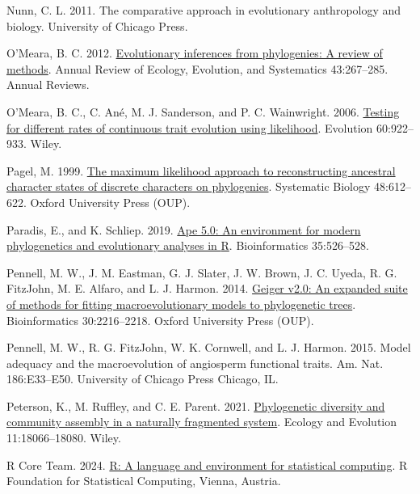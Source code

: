 \documentclass[fleqn,10pt,lineno]{wlpeerj} %
\newlength{\cslhangindent}
\newenvironment{CSLReferences}[2] %
 {\begin{list}{}{%
  \setlength{\itemindent}{0pt}
  \setlength{\leftmargin}{0pt}
  \setlength{\parsep}{0pt}
  \ifodd #1
   \setlength{\leftmargin}{\cslhangindent}
   \setlength{\itemindent}{-1\cslhangindent}
  \fi
  \setlength{\itemsep}{#2\baselineskip}}}
 {\end{list}}
\begin{document}
\begin{CSLReferences}{1}{0}
Nunn, C. L. 2011. The comparative approach in evolutionary anthropology and biology. University of Chicago Press.

O'Meara, B. C. 2012. \href{https://doi.org/10.1146/annurev-ecolsys-110411-160331}{Evolutionary inferences from phylogenies: A review of methods}. Annual Review of Ecology, Evolution, and Systematics 43:267--285. Annual Reviews.

O'Meara, B. C., C. Ané, M. J. Sanderson, and P. C. Wainwright. 2006. \href{https://doi.org/10.1111/j.0014-3820.2006.tb01171.x}{Testing for different rates of continuous trait evolution using likelihood}. Evolution 60:922--933. Wiley.

Pagel, M. 1999. \href{https://doi.org/10.1080/106351599260184}{The maximum likelihood approach to reconstructing ancestral character states of discrete characters on phylogenies}. Systematic Biology 48:612--622. Oxford University Press (OUP).

Paradis, E., and K. Schliep. 2019. \href{https://doi.org/10.1093/bioinformatics/bty633}{Ape 5.0: An environment for modern phylogenetics and evolutionary analyses in {R}}. Bioinformatics 35:526--528.

Pennell, M. W., J. M. Eastman, G. J. Slater, J. W. Brown, J. C. Uyeda, R. G. FitzJohn, M. E. Alfaro, and L. J. Harmon. 2014. \href{https://doi.org/10.1093/bioinformatics/btu181}{Geiger v2.0: An expanded suite of methods for fitting macroevolutionary models to phylogenetic trees}. Bioinformatics 30:2216--2218. Oxford University Press (OUP).

Pennell, M. W., R. G. FitzJohn, W. K. Cornwell, and L. J. Harmon. 2015. Model adequacy and the macroevolution of angiosperm functional traits. Am. Nat. 186:E33--E50. University of Chicago Press Chicago, IL.

Peterson, K., M. Ruffley, and C. E. Parent. 2021. \href{https://doi.org/10.1002/ece3.8404}{Phylogenetic diversity and community assembly in a naturally fragmented system}. Ecology and Evolution 11:18066--18080. Wiley.

R Core Team. 2024. \href{https://www.R-project.org/}{R: A language and environment for statistical computing}. R Foundation for Statistical Computing, Vienna, Austria.


\end{CSLReferences}
\end{document}
